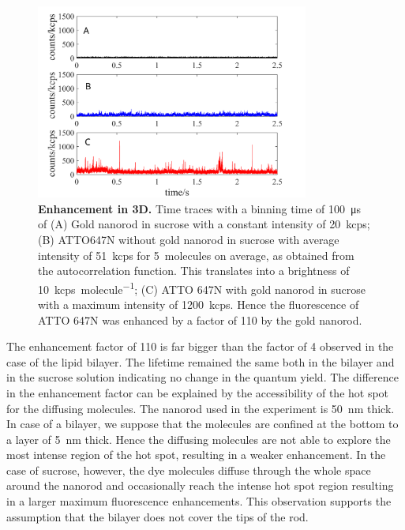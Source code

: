 \begin{figure}[ht]
  \centering
  \includegraphics[width=0.8\textwidth]{3D_enhc}
  \makeatletter
  \renewcommand{\fnum@figure}{\figurename~S\thefigure}
  \makeatother{}
  \caption{\textbf{Enhancement in 3D.} Time traces with a binning time of \SI{100}{\us} of (A) Gold nanorod in sucrose with a constant intensity of \SI{20}{kcps}; (B) ATTO647N without gold nanorod in sucrose with average intensity of \SI{51}{kcps} for \SI{5}{ molecules} on average, as obtained from the autocorrelation function.
  This translates into a brightness of \SI{10}{ kcps\per molecule}; (C) ATTO 647N with gold nanorod in sucrose with a maximum intensity of \SI{1200}{ kcps}.
  Hence the fluorescence of ATTO 647N was enhanced by a factor of 110 by the gold nanorod.}
  \label{SIfig:3D-enhc}
\end{figure}


The enhancement factor of 110 is far bigger than the factor of 4 observed in the case of the lipid bilayer. 
The lifetime remained the same both in the bilayer and in the sucrose solution indicating no change in the quantum yield.
The difference in the enhancement factor can be explained by the accessibility of the hot spot for the diffusing molecules.
The nanorod used in the experiment is \SI{50}{\nm} thick.
In case of a bilayer, we suppose that the molecules are confined at the bottom to a layer of \SI{5}{\nm} thick.
Hence the diffusing molecules are not able to explore the most intense region of the hot spot, resulting in a weaker enhancement.
In the case of sucrose, however, the dye molecules diffuse through the whole space around the nanorod and occasionally reach the intense hot spot region resulting in a larger maximum fluorescence enhancements.
This observation supports the assumption that the bilayer does not cover the tips of the rod.

